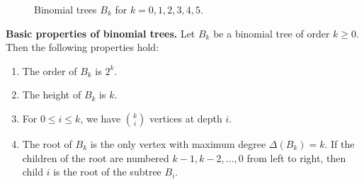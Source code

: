 \begin{figure}[!htbp]
{}
\caption{Binomial trees $B_k$ for $k = 0, 1, 2, 3, 4, 5$.}
\label{fig:tree_data_structures:binomial_trees_k0_4}
\end{figure}

\begin{lemma}
\label{lem:tree_data_structures:basic_properties_binomial_trees}
\textbf{Basic properties of binomial trees.}
Let $B_k$ be a binomial tree of order $k \geq 0$. Then the following
properties hold:
\begin{enumerate}
\item The order of $B_k$ is $2^k$.

\item The height of $B_k$ is $k$.

\item For $0 \leq i \leq k$, we have $\binom{k}{i}$ vertices at depth
  $i$.

\item The root of $B_k$ is the only vertex with maximum degree
  $\Delta(B_k) = k$. If the children of the root are numbered
  $k - 1, k - 2, \dots, 0$ from left to right, then child $i$ is the
  root of the subtree $B_i$.
\end{enumerate}
\end{lemma}

